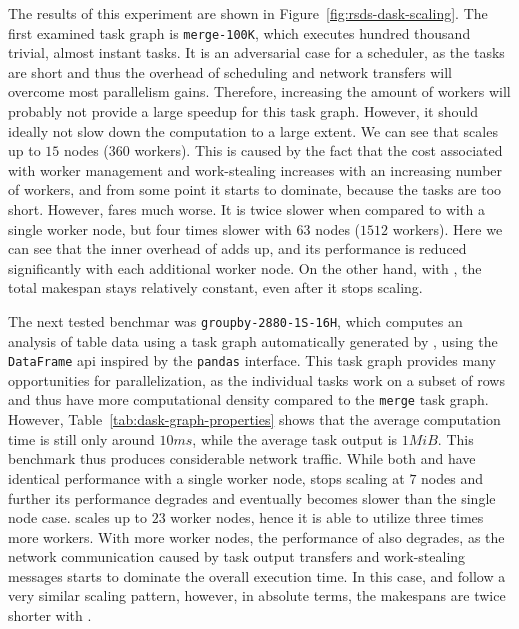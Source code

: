 The results of this experiment are shown in Figure~\ref{fig:rsds-dask-scaling}. The first examined
task graph is \texttt{merge-100K}, which executes hundred thousand trivial, almost instant
tasks. It is an adversarial case for a scheduler, as the tasks are short and thus the overhead of
scheduling and network transfers will overcome most parallelism gains. Therefore, increasing the
amount of workers will probably not provide a large speedup for this task graph. However, it should
ideally not slow down the computation to a large extent. We can see that
\rsds{} scales up to $15$ nodes
($360$ workers). This is caused by the fact that the cost associated with
worker management and work-stealing increases with an increasing number of workers, and from some
point it starts to dominate, because the tasks are too short. However, \dask{}
fares much worse. It is twice slower when compared to \rsds{} with a single
worker node, but four times slower with $63$ nodes
($1512$ workers). Here we can see that the inner overhead of
\dask{} adds up, and its performance is reduced significantly with each
additional worker node. On the other hand, with \rsds{}, the total makespan
stays relatively constant, even after it stops scaling.

The next tested benchmar was \texttt{groupby-2880-1S-16H}, which computes an analysis of table data
using a task graph automatically generated by \dask{}, using the
\texttt{DataFrame} \gls{api} inspired by the \texttt{pandas}
interface. This task graph provides many opportunities for parallelization, as the individual tasks
work on a subset of rows and thus have more computational density compared to the
\texttt{merge} task graph. However, Table~\ref{tab:dask-graph-properties} shows that the
average computation time is still only around $10ms$, while the average task
output is $1 MiB$. This benchmark thus produces considerable network traffic.
While both \dask{} and \rsds{} have identical performance
with a single worker node, \dask{} stops scaling at $7$
nodes and further its performance degrades and eventually becomes slower than the single node case.
\rsds{} scales up to $23$ worker nodes, hence it is able
to utilize three times more workers. With more worker nodes, the performance of
\rsds{} also degrades, as the network communication caused by task output
transfers and work-stealing messages starts to dominate the overall execution time. In this case,
\dask{} and \rsds{} follow a very similar scaling pattern,
however, in absolute terms, the makespans are twice shorter with \rsds{}.


